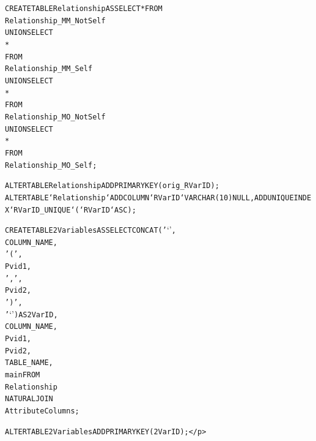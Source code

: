 \documentclass{acm_proc_article-sp}
\begin{document}
\begin{appendix}
\begin{alltt}
CREATE TABLE Relationship AS SELECT * FROM  
Relationship_MM_NotSelf    
UNION SELECT            
*                   
FROM
Relationship_MM_Self 
UNION SELECT 
*
FROM
Relationship_MO_NotSelf 
UNION SELECT 
*
FROM
Relationship_MO_Self;

ALTER TABLE Relationship ADD PRIMARY KEY (orig_RVarID);
ALTER TABLE `Relationship` ADD COLUMN `RVarID` VARCHAR(10) NULL , ADD UNIQUE INDEX `RVarID_UNIQUE` (`RVarID` ASC) ; 


CREATE TABLE 2Variables AS SELECT CONCAT('`',
        COLUMN_NAME,
        '(',
        Pvid1,
        ',',
        Pvid2,
        ')',
        '`') AS 2VarID,
COLUMN_NAME,
Pvid1,
Pvid2,
TABLE_NAME,
main FROM
Relationship
    NATURAL JOIN
AttributeColumns;

ALTER TABLE 2Variables ADD PRIMARY KEY (2VarID);</p>\end{alltt}

%
%

\end{appendix}
\end{document}

